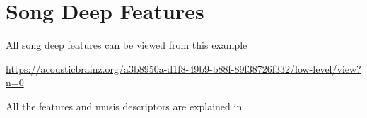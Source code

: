 
\chapter{Song Deep Features}

\label{AppendixB}

All song deep features can be viewed from this example

\url{https://acousticbrainz.org/a3b8950a-d1f8-49b9-b88f-89f38726f332/low-level/view?n=0}

All the features and musis descriptors are explained in \cite{essentiafeatures}


